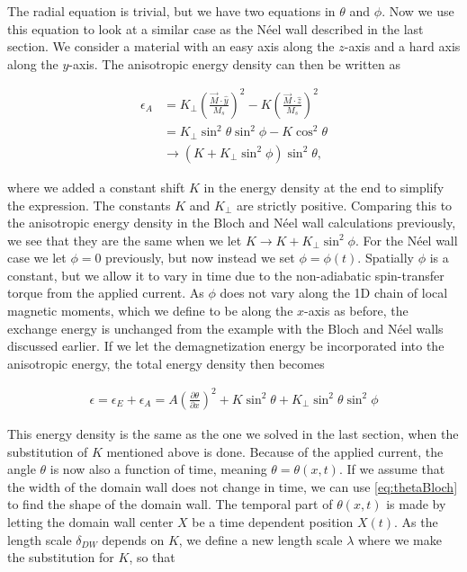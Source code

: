 \documentclass[1p]{elsarticle}		%
\numberwithin{equation}{section}
\begin{document}
The radial equation is trivial, but we have two equations in $\theta$ and $\phi$. Now we use this equation to look at a similar case as the N\'{e}el wall described in the last section. We consider a material with an easy axis along the $z$-axis and a hard axis along the $y$-axis. The anisotropic energy density can then be written as

\begin{align}
\nonumber \epsilon_A &= K_{\perp} (\frac{\vec{M}\cdot\hat{y}}{M_s})^2 - K (\frac{\vec{M}\cdot\hat{z}}{M_s})^2 \\
\nonumber &= K_{\perp}\sin^2\theta\sin^2\phi - K \cos^2\theta \\
&\rightarrow (K + K_{\perp} \sin^2\phi)\sin^2\theta,
\end{align}

where we added a constant shift $K$ in the energy density at the end to simplify the expression. The constants $K$ and $K_{\perp}$ are strictly positive. Comparing this to the anisotropic energy density in the Bloch and N\'{e}el wall calculations previously, we see that they are the same when we let $K \rightarrow K + K_{\perp}\sin^2\phi$. For the N\'{e}el wall case we let $\phi = 0$ previously, but now instead we set $\phi = \phi (t)$. Spatially $\phi$ is a constant, but we allow it to vary in time due to the non-adiabatic spin-transfer torque from the applied current. As $\phi$ does not vary along the 1D chain of local magnetic moments, which we define to be along the $x$-axis as before, the exchange energy is unchanged from the example with the Bloch and N\'{e}el walls discussed earlier. If we let the demagnetization energy be incorporated into the anisotropic energy, the total energy density then becomes

\begin{align}
\label{eq:energydensity_ex_a}
\epsilon = \epsilon_E + \epsilon_A = A (\frac{\partial \theta}{\partial x})^2 + K\sin^2\theta + K_{\perp} \sin^2\theta\sin^2\phi
\end{align}

This energy density is the same as the one we solved in the last section, when the substitution of $K$ mentioned above is done. Because of the applied current, the angle $\theta$ is now also a function of time, meaning $\theta = \theta(x,t)$. If we assume that the width of the domain wall does not change in time, we can use \eqref{eq:thetaBloch} to find the shape of the domain wall. The temporal part of $\theta(x,t)$ is made by letting the domain wall center $X$ be a time dependent position $X(t)$. As the length scale $\delta_{DW}$ depends on $K$, we define a new length scale $\lambda$ where we make the substitution for $K$, so that
\end{document}

